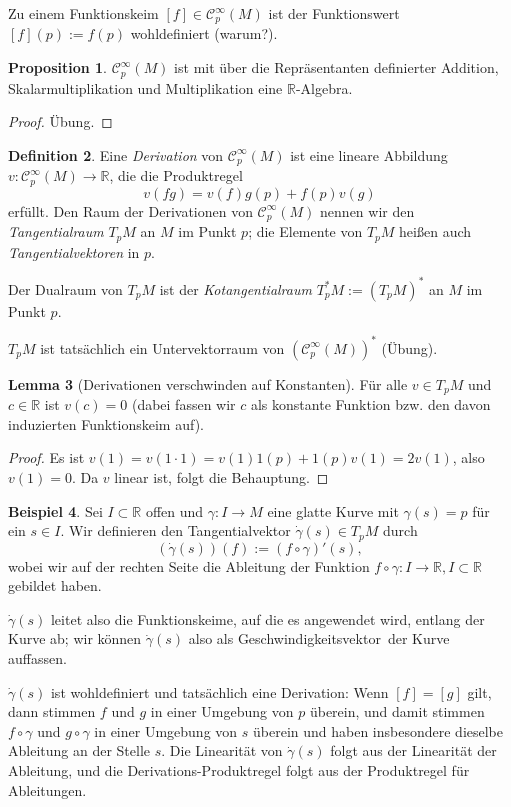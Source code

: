 \documentclass[a4paper]{scrreprt}
\numberwithin{equation}{chapter}
\newcommand{\sC}{\mathcal{C}^{\infty}}
\theoremstyle{definition}
\newtheorem{defn}{Definition}[section]
\newtheorem{lemma}[defn]{Lemma}
\newtheorem{prop}[defn]{Proposition}
\newtheorem{bsp}[defn]{Beispiel}
\newcommand{\bewUeb}{\begin{proof}Übung.\end{proof}}
\begin{document}
Zu einem Funktionskeim $[f] \in \sC_p(M)$ ist der Funktionswert $[f](p) := f(p)$ wohldefiniert (warum?).

\begin{prop}
	$\sC_p(M)$ ist mit über die Repräsentanten definierter Addition, Skalarmultiplikation und Multiplikation eine $\mathbb R$-Algebra. \bewUeb
\end{prop}

\begin{defn}
	Eine \emph{Derivation} von $\sC_p(M)$ ist eine lineare Abbildung $v\colon \sC_p(M) \to \mathbb R$, die die \glqq Produktregel\grqq\ \[v(fg) = v(f) g(p) + f(p) v(g)\] erfüllt. Den Raum der Derivationen von $\sC_p(M)$ nennen wir den \emph{Tangentialraum} $T_pM$ an $M$ im Punkt $p$; die Elemente von $T_pM$ heißen auch \emph{Tangentialvektoren} in $p$.

	Der Dualraum von $T_pM$ ist der \emph{Kotangentialraum} $T_p^*M := (T_pM)^*$ an $M$ im Punkt $p$.
\end{defn}

$T_pM$ ist tatsächlich ein Untervektorraum von $(\sC_p(M))^*$ (Übung).

\begin{lemma}[Derivationen verschwinden auf Konstanten]
	Für alle $v \in T_pM$ und $c \in \mathbb R$ ist $v(c) = 0$ (dabei fassen wir $c$ als konstante Funktion bzw. den davon induzierten Funktionskeim auf).
	
	\begin{proof}
		Es ist $v(1) = v(1\cdot 1) = v(1) 1(p) + 1(p) v(1) = 2 v(1)$, also $v(1) = 0$. Da $v$ linear ist, folgt die Behauptung.
	\end{proof}
\end{lemma}

\begin{bsp} \label{bsp:kurve_geschw}
	Sei $I\subset\mathbb R$ offen und $\gamma\colon I \to M$ eine glatte Kurve mit $\gamma(s) = p$ für ein $s \in I$. Wir definieren den Tangentialvektor $\dot\gamma(s) \in T_pM$ durch \[(\dot\gamma(s))(f) := (f\circ\gamma)'(s),\] wobei wir auf der rechten Seite die Ableitung der Funktion $f\circ\gamma \colon I \to \mathbb R, I \subset \mathbb R$ gebildet haben.

	$\dot\gamma(s)$ leitet also die Funktionskeime, auf die es angewendet wird, entlang der Kurve ab; wir können $\dot\gamma(s)$ also als \glqq Geschwindigkeitsvektor\grqq\ der Kurve auffassen.

	$\dot\gamma(s)$ ist wohldefiniert und tatsächlich eine Derivation: Wenn $[f] = [g]$ gilt, dann stimmen $f$ und $g$ in einer Umgebung von $p$ überein, und damit stimmen $f\circ\gamma$ und $g\circ\gamma$ in einer Umgebung von $s$ überein und haben insbesondere dieselbe Ableitung an der Stelle $s$. Die Linearität von $\dot\gamma(s)$ folgt aus der Linearität der Ableitung, und die Derivations-Produktregel folgt aus der Produktregel für Ableitungen.
\end{bsp}
\end{document}
